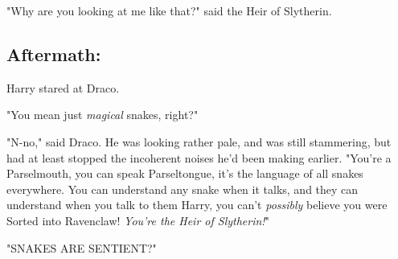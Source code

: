 {\el}

{\el}

{\el}

{\el}

"Why are you looking at me like that?" said the Heir of Slytherin.
\sbreak
\vspace{-2\baselineskip}
\subsection{Aftermath:}

Harry stared at Draco.

"You mean just \emph{magical} snakes, right?"

"N-no," said Draco. He was looking rather pale, and was still stammering, but
had at least stopped the incoherent noises he'd been making earlier. "You're a
Parselmouth, you can speak Parseltongue, it's the language of all snakes
everywhere. You can understand any snake when it talks, and they can understand
when you talk to them{\el} Harry, you can't \emph{possibly} believe you were
Sorted into Ravenclaw! \emph{You're the Heir of Slytherin!}"

{\el}

{\el}

{\el}

{\el}

{\el}

"SNAKES ARE SENTIENT?"
